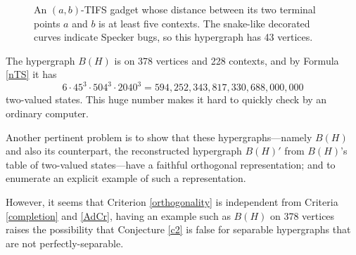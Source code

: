 \documentclass[%
12pt,
prereprint,
showpacs,
showkeys,
preprintnumbers,
amsmath,amssymb,
aps,
pra,
longbibliography,
notitlepage
]{revtex4-1}
\theoremstyle{definition}
\begin{document}
\begin{figure}
\begin{center}
                \end{center}
                \caption{\label{Baba-Taher}
                        An $(a,b)$-TIFS gadget whose distance between its two terminal points $a$ and $b$ is at least five contexts. The snake-like decorated curves indicate Specker bugs, so this hypergraph has 43 vertices.
                }
        \end{figure}

        The hypergraph $B(H)$ is on 378 vertices and 228 contexts, and by Formula \ref{nTS} it has $$6\cdot 45^3\cdot 504^3\cdot 2040 ^3=594,252,343,817,330,688,000,000$$ two-valued states. This huge number makes it hard to quickly check by an ordinary computer.

        Another pertinent problem is to show that these hypergraphs---namely $B(H)$ and also its counterpart, the reconstructed hypergraph $B(H)'$ from $B(H)$'s table of two-valued states---have a faithful orthogonal representation; and to enumerate an explicit example of such a representation.

        However, it seems that Criterion \ref{orthogonality} is independent from Criteria \ref{completion} and \ref{AdCr}, having an example such as $B(H)$ on 378 vertices raises the possibility that Conjecture \ref{c2} is false for separable hypergraphs that are not perfectly-separable.
\end{document}

